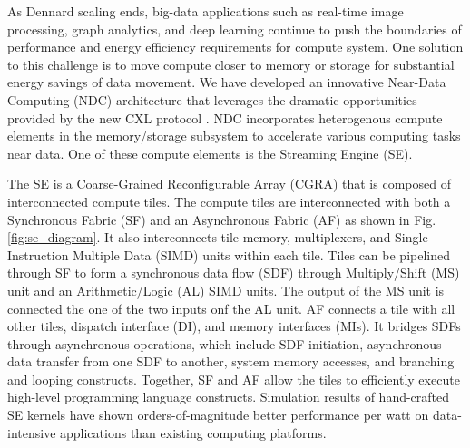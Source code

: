 As Dennard scaling ends, big-data applications such as real-time image processing, graph analytics, and deep learning continue to push the boundaries of performance and energy efficiency requirements for compute system. 
One solution to this challenge is to move compute closer to memory or storage for substantial energy savings of data movement. 
We have developed an innovative Near-Data Computing (NDC) architecture that leverages the dramatic opportunities provided by the new CXL protocol \cite{sharma2020compute}. 
NDC incorporates heterogenous compute elements in the memory/storage subsystem to accelerate various computing tasks near data. 
One of these compute elements is the Streaming Engine (SE).

The SE is a Coarse-Grained Reconfigurable Array (CGRA) that is composed of interconnected compute tiles.  
The compute tiles are interconnected with both a Synchronous Fabric (SF) and an Asynchronous Fabric (AF) as shown in Fig. \ref{fig:se_diagram}.
It also interconnects tile memory, multiplexers, and Single Instruction Multiple Data (SIMD) units within each tile. 
Tiles can be pipelined through SF to form a synchronous data flow (SDF) through Multiply/Shift (MS) unit and an Arithmetic/Logic (AL) SIMD units. 
The output of the MS unit is connected the one of the two inputs onf the AL unit.
AF connects a tile with all other tiles, dispatch interface (DI), and memory interfaces (MIs).
It bridges SDFs through asynchronous operations, which include SDF initiation, asynchronous data transfer from one SDF to another, system memory accesses, and branching and looping constructs. 
Together, SF and AF allow the tiles to efficiently execute high-level programming language constructs.
Simulation results of hand-crafted SE kernels have shown orders-of-magnitude better performance per watt on data-intensive applications than existing computing platforms.

